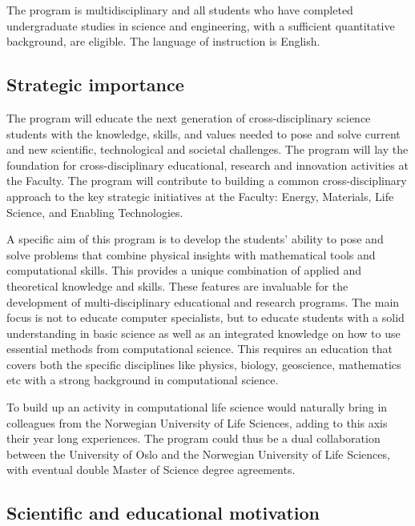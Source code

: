 \documentclass[%
oneside,                 %
final,                   %
10pt]{article}
\begin{document}
The program is multidisciplinary and all students who have completed
undergraduate studies in science and engineering, with a sufficient
quantitative background, are eligible.  The language of instruction is
English.



\subsection*{Strategic importance}

The program will educate the next generation of cross-disciplinary
science students with the knowledge, skills, and values needed to pose
and solve current and new scientific, technological and societal
challenges. The program will lay the foundation for cross-disciplinary
educational, research and innovation activities at the Faculty. The
program will contribute to building a common cross-disciplinary
approach to the key strategic initiatives at the Faculty: Energy,
Materials, Life Science, and Enabling Technologies.

A specific aim of this program is to develop the students' ability to pose and
solve problems that combine physical insights with mathematical tools
and computational skills. This provides a unique combination
of applied and theoretical knowledge and skills. These features are invaluable
for the development of multi-disciplinary educational and research programs.
The main focus is not to educate computer
specialists, but to educate students with a solid understanding in basic science
as well as an integrated knowledge on how  to use
essential methods from computational science. This requires an
education that covers both the specific disciplines like physics, biology,
geoscience, mathematics etc with a strong background in computational science.

To build up an activity in computational life science would naturally bring in colleagues from the Norwegian University of Life Sciences,
adding to this axis their year long experiences.
The program could thus be a dual collaboration between the University of Oslo and the Norwegian University of Life Sciences, with eventual
double Master of Science degree agreements.

\subsection*{Scientific and educational motivation}
\end{document}
